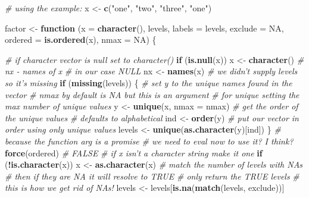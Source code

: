 \documentclass[]{book}
\newenvironment{Shaded}{\begin{snugshade}}{\end{snugshade}}
\newcommand{\CommentTok}[1]{\textcolor[rgb]{0.56,0.35,0.01}{\textit{#1}}}
\newcommand{\ControlFlowTok}[1]{\textcolor[rgb]{0.13,0.29,0.53}{\textbf{#1}}}
\newcommand{\DataTypeTok}[1]{\textcolor[rgb]{0.13,0.29,0.53}{#1}}
\newcommand{\KeywordTok}[1]{\textcolor[rgb]{0.13,0.29,0.53}{\textbf{#1}}}
\newcommand{\NormalTok}[1]{#1}
\newcommand{\OperatorTok}[1]{\textcolor[rgb]{0.81,0.36,0.00}{\textbf{#1}}}
\newcommand{\OtherTok}[1]{\textcolor[rgb]{0.56,0.35,0.01}{#1}}
\newcommand{\StringTok}[1]{\textcolor[rgb]{0.31,0.60,0.02}{#1}}
\begin{document}
\begin{Shaded}
\begin{Highlighting}[]
\CommentTok{# using the example:}
\NormalTok{x <-}\StringTok{ }\KeywordTok{c}\NormalTok{(}\StringTok{"one"}\NormalTok{, }\StringTok{"two"}\NormalTok{, }\StringTok{"three"}\NormalTok{, }\StringTok{"one"}\NormalTok{)}

\NormalTok{factor <-}\StringTok{ }\ControlFlowTok{function}\NormalTok{ (}\DataTypeTok{x =} \KeywordTok{character}\NormalTok{(), levels, }\DataTypeTok{labels =}\NormalTok{ levels, }\DataTypeTok{exclude =} \OtherTok{NA}\NormalTok{, }\DataTypeTok{ordered =} \KeywordTok{is.ordered}\NormalTok{(x), }\DataTypeTok{nmax =} \OtherTok{NA}\NormalTok{) \{}
 
   \CommentTok{# if character vector is null set to character()}
  \ControlFlowTok{if}\NormalTok{ (}\KeywordTok{is.null}\NormalTok{(x)) }
\NormalTok{      x <-}\StringTok{ }\KeywordTok{character}\NormalTok{()}
  \CommentTok{# nx - names of x}
  \CommentTok{# in our case NULL}
\NormalTok{    nx <-}\StringTok{ }\KeywordTok{names}\NormalTok{(x)}
    \CommentTok{# we didn't supply levels so it's missing}
    \ControlFlowTok{if}\NormalTok{ (}\KeywordTok{missing}\NormalTok{(levels)) \{}
      \CommentTok{# set y to the unique names found in the vector}
      \CommentTok{# nmax by default is NA but this is an argument}
      \CommentTok{# for unique setting the max number of unique values}
\NormalTok{        y <-}\StringTok{ }\KeywordTok{unique}\NormalTok{(x, }\DataTypeTok{nmax =}\NormalTok{ nmax)}
        \CommentTok{# get the order of the unique values}
        \CommentTok{# defaults to alphabetical}
\NormalTok{        ind <-}\StringTok{ }\KeywordTok{order}\NormalTok{(y)}
        \CommentTok{# put our vector in order using only unique values}
\NormalTok{        levels <-}\StringTok{ }\KeywordTok{unique}\NormalTok{(}\KeywordTok{as.character}\NormalTok{(y)[ind])}
\NormalTok{    \}}
    \CommentTok{# because the function arg is a promise }
    \CommentTok{# we need to eval now to use it? I think?}
    \KeywordTok{force}\NormalTok{(ordered) }\CommentTok{# FALSE}
    \CommentTok{# if x isn't a character string make it one}
    \ControlFlowTok{if}\NormalTok{ (}\OperatorTok{!}\KeywordTok{is.character}\NormalTok{(x)) }
\NormalTok{        x <-}\StringTok{ }\KeywordTok{as.character}\NormalTok{(x)}
    \CommentTok{# match the number of levels with NAs}
    \CommentTok{# then if they are NA it will resolve to TRUE}
    \CommentTok{# only return the TRUE levels}
    \CommentTok{# this is how we get rid of NAs!}
\NormalTok{    levels <-}\StringTok{ }\NormalTok{levels[}\KeywordTok{is.na}\NormalTok{(}\KeywordTok{match}\NormalTok{(levels, exclude))]}

\end{Highlighting}
\end{Shaded}
\end{document}
